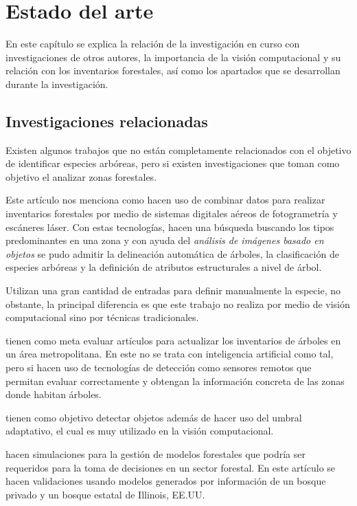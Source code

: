 \chapter{Estado del arte}
En este capítulo se explica la relación de la investigación en curso con investigaciones de otros autores, la importancia de la visión computacional y su relación con los inventarios forestales, así como los apartados que se desarrollan durante la investigación.

\section{Investigaciones relacionadas}
Existen algunos trabajos que no están completamente relacionados con el objetivo de identificar especies arbóreas, pero si existen investigaciones que toman como objetivo el analizar zonas forestales.

Este artículo nos menciona como hacen uso de combinar datos para realizar inventarios forestales por medio de sistemas digitales aéreos de fotogrametría y escáneres láser. Con estas tecnologías, hacen una búsqueda buscando los tipos predominantes en una zona y con ayuda del \emph{análisis de imágenes basado en objetos} se pudo admitir la delineación automática de árboles, la clasificación de especies arbóreas y la definición de atributos estructurales a nivel de árbol. 
\newline
\break


\citet{rf1} Utilizan una gran cantidad de entradas para definir manualmente la especie, no obstante, la principal diferencia es que este trabajo no realiza por medio de visión computacional sino por técnicas tradicionales.
 
\citet{rf2} tienen como meta evaluar artículos para actualizar los inventarios de árboles en un área metropolitana. En este no se trata con inteligencia artificial como tal, pero si hacen uso de tecnologías de detección como sensores remotos que permitan evaluar correctamente y obtengan la información concreta de las zonas donde habitan  árboles.

\citet{rf3} tienen como objetivo detectar objetos además de hacer uso del umbral adaptativo, el cual es muy utilizado en la visión computacional. %

\citet{rf9} hacen simulaciones para la gestión de modelos forestales que podría ser requeridos para la toma de decisiones en un sector forestal. En este artículo se hacen validaciones usando modelos generados por información de un bosque privado y un bosque estatal de Illinois, EE.UU.

